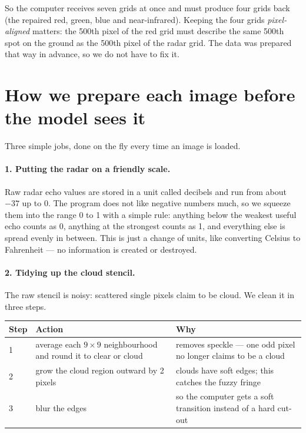 \documentclass[11pt,a4paper]{article}
\begin{document}
So the computer receives seven grids at once and must produce four grids back (the repaired red,
green, blue and near-infrared). Keeping the four grids \emph{pixel-aligned} matters: the 500th
pixel of the red grid must describe the same 500th spot on the ground as the 500th pixel of the
radar grid. The data was prepared that way in advance, so we do not have to fix it.

\section{How we prepare each image before the model sees it}

Three simple jobs, done on the fly every time an image is loaded.

\paragraph{1. Putting the radar on a friendly scale.}
Raw radar echo values are stored in a unit called decibels and run from about $-37$ up to $0$. The
program does not like negative numbers much, so we squeeze them into the range 0 to 1 with a simple
rule: anything below the weakest useful echo counts as 0, anything at the strongest counts as 1, and
everything else is spread evenly in between. This is just a change of units, like converting
Celsius to Fahrenheit --- no information is created or destroyed.

\paragraph{2. Tidying up the cloud stencil.}
The raw stencil is noisy: scattered single pixels claim to be cloud. We clean it in three steps.

\begin{center}
\begin{tabular}{@{}llp{6.6cm}@{}}
\hline
Step & Action & Why \\
\hline
1 & average each $9\times9$ neighbourhood and round it to clear or cloud & removes speckle --- one odd pixel no longer claims to be a cloud \\
2 & grow the cloud region outward by 2 pixels & clouds have soft edges; this catches the fuzzy fringe \\
3 & blur the edges & so the computer gets a soft transition instead of a hard cut-out \\
\hline
\end{tabular}
\end{center}
\end{document}
